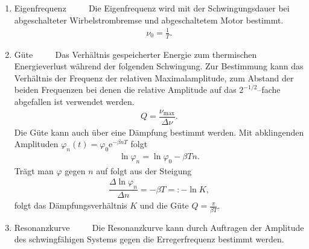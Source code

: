 \begin{enumerate}[label=--]
        \item Eigenfrequenz $\qquad $ 
                Die Eigenfrequenz wird mit der Schwingungsdauer bei abgeschalteter Wirbelstrombremse und abgeschaltetem Motor bestimmt.
                \begin{align} 
                        \nu _0=\tfrac{1}{T}
                .\end{align} 
        \item Güte $\qquad $ 
                Das Verhältnis gespeicherter Energie zum thermischen Energieverlust während der folgenden Schwingung.
                Zur Bestimmung kann das Verhältnis der Frequenz der relativen Maximalamplitude, zum Abstand der beiden Frequenzen bei denen die relative Amplitude auf das $2^{-1/2}$--fache abgefallen ist verwendet werden.
                \begin{align} 
                        Q=\dfrac{\nu _{\text{max} }}{\Delta \nu }
                .\end{align} 
                Die Güte kann auch über eine Dämpfung bestimmt werden. Mit abklingenden Amplituden $\varphi _n\left(t\right)=\varphi _0\text{e}^{-\beta nT}$ folgt 
                \begin{align} 
                        \ln \varphi _n=\ln \varphi _0-\beta Tn
                .\end{align} 
                Trägt man $\varphi $ gegen $n$ auf folgt aus der Steigung
                \begin{align} 
                        \dfrac{\Delta \ln \varphi _n}{\Delta n}=-\beta T=:-\ln K
                ,\end{align} 
                folgt das Dämpfungsverhältnis $K$ und die Güte $Q=\tfrac{\pi }{\beta T}$.
        \item Resonanzkurve $\qquad $ 
                Die Resonanzkurve kann durch Auftragen der Amplitude des schwingfähigen Systems gegen die Erregerfrequenz bestimmt werden.
\end{enumerate}

\newpage
